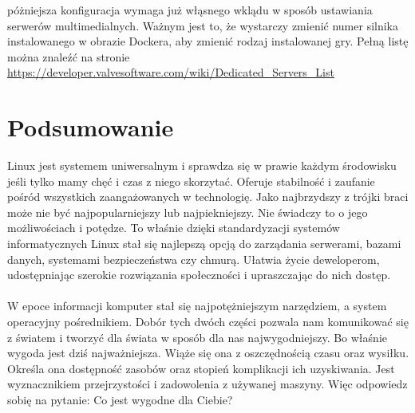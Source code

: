 \documentclass[10pt,a4paper]{report}
\begin{document}
póżniejsza konfiguracja wymaga już włąsnego wklądu w sposób ustawiania serwerów multimedialnych. Ważnym jest to, że wystarczy zmienić numer silnika instalowanego w obrazie Dockera, aby zmienić rodzaj instalowanej gry. Pełną listę można znaleźć na stronie \url{https://developer.valvesoftware.com/wiki/Dedicated_Servers_List}

	
	

	\newpage
	
\chapter{Podsumowanie}

	Linux jest systemem uniwersalnym i sprawdza się w prawie każdym środowisku jeśli tylko mamy chęć i czas z niego skorzytać. Oferuje stabilność i zaufanie pośród wszystkich zaangażowanych w technologię. Jako najbrzydszy z trójki braci może nie być najpopularniejszy lub najpiekniejszy. Nie świadczy to o jego możliwościach i potędze. To właśnie dzięki standardyzacji systemów informatycznych Linux stał się najlepszą opcją do zarządania serwerami, bazami danych, systemami bezpieczeństwa czy chmurą. Ułatwia życie deweloperom, udostępniając szerokie rozwiązania społeczności i upraszczając do nich dostęp. \\\\ W epoce informacji komputer stał się najpotężniejszym narzędziem, a system operacyjny pośrednikiem. Dobór tych dwóch części pozwala nam komunikować się z światem i tworzyć dla świata w sposób dla nas najwygodniejszy. Bo właśnie wygoda jest dziś najważniejsza. Wiąże się ona z oszczędnością czasu oraz wysiłku. Określa ona dostępność zasobów oraz stopień komplikacji ich uzyskiwania. Jest wyznacznikiem przejrzystości i zadowolenia z używanej maszyny. Więc odpowiedz sobię na pytanie: Co jest wygodne dla Ciebie?\\\\
	
\end{document}
